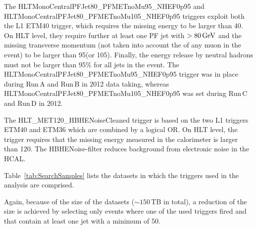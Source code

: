 The HLTMonoCentralPFJet80\_PFMETnoMu95\_NHEF0p95 and HLTMonoCentralPFJet80\_PFMETnoMu105\_NHEF0p95 triggers exploit both the L1 ETM40 trigger, which requires the missing energy to be larger than 40\gev.
On HLT level, they require further at least one PF jet with \pt$>80\,\text{Ge}\kern-0.06667em\text{V}$ and the missing transverse momentum \met (not taken into account the \pt of any muon in the event) to be larger than 95\gev (or 105\gev).
Finally, the energy release by neutral hadrons must not be larger than 95\% for all jets in the event.
The HLTMonoCentralPFJet80\_PFMETnoMu95\_NHEF0p95 trigger was in place during Run\,A and Run\,B in 2012 data taking, whereas HLTMonoCentralPFJet80\_PFMETnoMu105\_NHEF0p95 was set during Run\,C and Run\,D in 2012.

The HLT\_MET120\_HBHENoiseCleaned trigger is based on the two L1 triggers ETM40 and ETM36 which are combined by a logical OR.
On HLT level, the trigger requires that the missing energy measured in the calorimeter is larger than 120\gev.
The HBHENoise-filter reduces background from electronic noise in the HCAL.

Table~\ref{tab:SearchSamples} lists the datasets in which the triggers used in the analysis are comprised. 
\renewcommand{\arraystretch}{1.5}
\begin{table}[!hbt]
\centering
\caption{MET data samples used in the search with the contained integrated luminosity.}
\label{tab:SearchSamples}
\end{table}  
Again, because of the size of the datasets ($\sim150\,$TB in total), a reduction of the size is achieved by selecting only events where one of the used triggers fired and that contain at least one jet with a minimum \pt of 50\gev.\\

